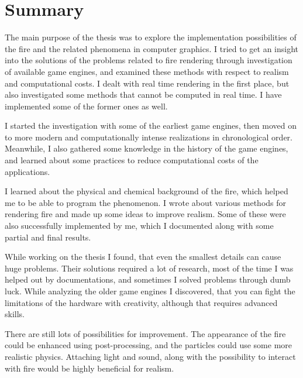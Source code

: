\documentclass[12pt,a4paper]{report}
\begin{document}
\section*{Summary}

The main purpose of the thesis was to explore the implementation possibilities of the fire and the related phenomena in computer graphics. I tried to get an insight into the solutions of the problems related to fire rendering through investigation of available game engines, and examined these methods with respect to realism and computational costs. I dealt with real time rendering in the first place, but also investigated some methods that cannot be computed in real time. I have implemented some of the former ones as well.

I started the investigation with some of the earliest game engines, then moved on to more modern and computationally intense realizations in chronological order. Meanwhile, I also gathered some knowledge in the history of the game engines, and learned about some practices to reduce computational costs of the applications. 

I learned about the physical and chemical background of the fire, which helped me to be able to program the phenomenon. I wrote about various methods for rendering fire and made up some ideas to improve realism. Some of these were also successfully implemented by me, which I documented along with some partial and final results.

While working on the thesis I found, that even the smallest details can cause huge problems. Their solutions required a lot of research, most of the time I was helped out by documentations, and sometimes I solved problems through dumb luck. While analyzing the older game engines I discovered, that you can fight the limitations of the hardware with creativity, although that requires advanced skills.

There are still lots of possibilities for improvement. The appearance of the fire could be enhanced using post-processing, and the particles could use some more realistic physics. Attaching light and sound, along with the possibility to interact with fire would be highly beneficial for realism.
\end{document}

